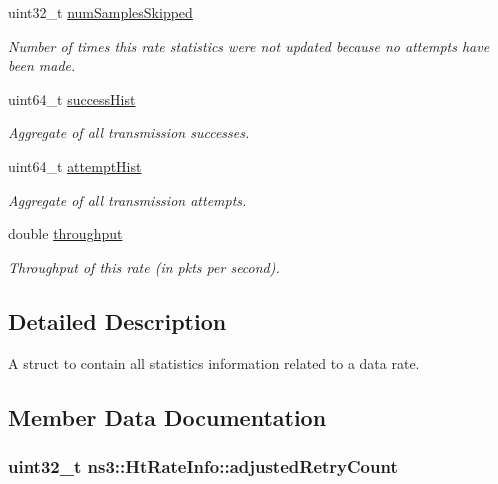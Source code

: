 \begin{DoxyCompactItemize}
uint32\+\_\+t \hyperlink{structns3_1_1HtRateInfo_a0738e1ba583c6e4058861389e715e03a}{num\+Samples\+Skipped}
\begin{DoxyCompactList}\small\item\em Number of times this rate statistics were not updated because no attempts have been made. \end{DoxyCompactList}\item 
uint64\+\_\+t \hyperlink{structns3_1_1HtRateInfo_a2e307f392bdaa10602a375cdb9525063}{success\+Hist}
\begin{DoxyCompactList}\small\item\em Aggregate of all transmission successes. \end{DoxyCompactList}\item 
uint64\+\_\+t \hyperlink{structns3_1_1HtRateInfo_aa96f3d46e3b1fcd1fae461138a8adb3a}{attempt\+Hist}
\begin{DoxyCompactList}\small\item\em Aggregate of all transmission attempts. \end{DoxyCompactList}\item 
double \hyperlink{structns3_1_1HtRateInfo_aad70746f027b325a5af640a6befb56a8}{throughput}
\begin{DoxyCompactList}\small\item\em Throughput of this rate (in pkts per second). \end{DoxyCompactList}\end{DoxyCompactItemize}


\subsection{Detailed Description}
A struct to contain all statistics information related to a data rate. 

\subsection{Member Data Documentation}
\subsubsection[{\texorpdfstring{adjusted\+Retry\+Count}{adjustedRetryCount}}]{\setlength{\rightskip}{0pt plus 5cm}uint32\+\_\+t ns3\+::\+Ht\+Rate\+Info\+::adjusted\+Retry\+Count}\hypertarget{structns3_1_1HtRateInfo_ad64e7a7ad5d380145615b2fc9b53454c}{}\label{structns3_1_1HtRateInfo_ad64e7a7ad5d380145615b2fc9b53454c}


